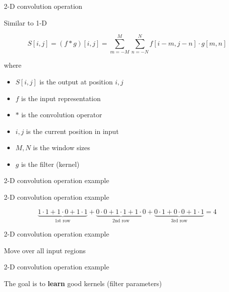 \documentclass[12pt]{beamer}
\begin{document}
\begin{frame}{2-D convolution operation}
	
	Similar to 1-D
	
	$$
	S[i, j] = (f * g) [i,j] = \sum_{m = -M}^{M} \sum_{n = -N}^{N} f[i - m, j - n] \cdot g[m, n]
	$$
	
	where
	
	\begin{itemize}
		\item $S[i, j]$ is the output at position $i, j$
		\item $f$ is the input representation
		\item $*$ is the convolution operator
		\item $i, j$ is the current position in input
		\item $M, N$ is the window sizes
		\item $g$ is the filter (kernel)
	\end{itemize}
	
	
\end{frame}


\begin{frame}[fragile]{2-D convolution operation example}
	

	
\end{frame}

\begin{frame}{2-D convolution operation example}
	


\begin{small}
$$
\underbrace{1 \cdot 1 + 1 \cdot 0 + 1 \cdot 1}_{\text{1st row}} +
\underbrace{0 \cdot 0 + 1 \cdot 1 + 1 \cdot 0}_{\text{2nd row}} +
\underbrace{0 \cdot 1 + 0 \cdot 0 + 1 \cdot 1}_{\text{3rd row}} = 4
$$
\end{small}
	
\end{frame}

\begin{frame}{2-D convolution operation example}

Move over all input regions

	
		
\end{frame}

\begin{frame}{2-D convolution operation example}

The goal is to \textbf{learn} good kernels (filter parameters)

	
	
\end{frame}
\end{document}
